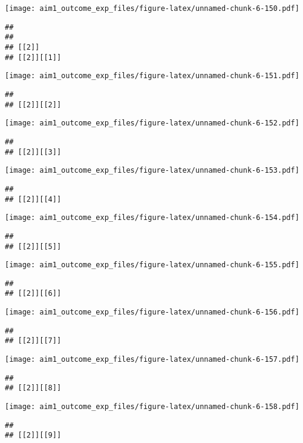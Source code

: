 \documentclass[
]{article}
\begin{document}
\texttt{[image: aim1\_outcome\_exp\_files/figure-latex/unnamed-chunk-6-150.pdf]}

\begin{verbatim}
## 
## 
## [[2]]
## [[2]][[1]]
\end{verbatim}

\texttt{[image: aim1\_outcome\_exp\_files/figure-latex/unnamed-chunk-6-151.pdf]}

\begin{verbatim}
## 
## [[2]][[2]]
\end{verbatim}

\texttt{[image: aim1\_outcome\_exp\_files/figure-latex/unnamed-chunk-6-152.pdf]}

\begin{verbatim}
## 
## [[2]][[3]]
\end{verbatim}

\texttt{[image: aim1\_outcome\_exp\_files/figure-latex/unnamed-chunk-6-153.pdf]}

\begin{verbatim}
## 
## [[2]][[4]]
\end{verbatim}

\texttt{[image: aim1\_outcome\_exp\_files/figure-latex/unnamed-chunk-6-154.pdf]}

\begin{verbatim}
## 
## [[2]][[5]]
\end{verbatim}

\texttt{[image: aim1\_outcome\_exp\_files/figure-latex/unnamed-chunk-6-155.pdf]}

\begin{verbatim}
## 
## [[2]][[6]]
\end{verbatim}

\texttt{[image: aim1\_outcome\_exp\_files/figure-latex/unnamed-chunk-6-156.pdf]}

\begin{verbatim}
## 
## [[2]][[7]]
\end{verbatim}

\texttt{[image: aim1\_outcome\_exp\_files/figure-latex/unnamed-chunk-6-157.pdf]}

\begin{verbatim}
## 
## [[2]][[8]]
\end{verbatim}

\texttt{[image: aim1\_outcome\_exp\_files/figure-latex/unnamed-chunk-6-158.pdf]}

\begin{verbatim}
## 
## [[2]][[9]]
\end{verbatim}
\end{document}
